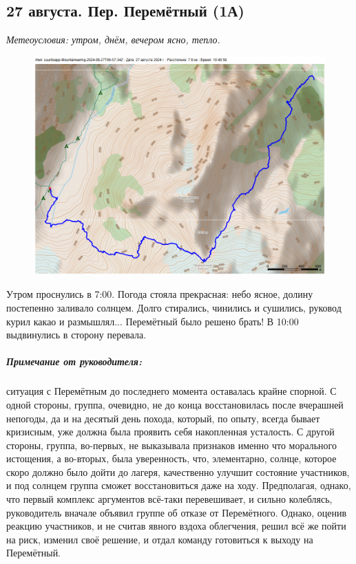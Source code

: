 \subsection{27 августа. Пер. Перемётный (1А)}
\textit{Метеоусловия: утром, днём, вечером ясно, тепло.}

\begin{figure}[h!]
	\centering
	\includegraphics[angle=0, width=0.7\linewidth]{../pics/mini_maps/27}
	\label{fig:mini_27}
\end{figure}

Утром проснулись в 7:00. Погода стояла прекрасная: небо ясное, долину постепенно заливало солнцем. Долго стирались, чинились и сушились, руковод курил какао и размышлял... Перемётный было решено брать!
В 10:00 выдвинулись в сторону перевала. 

\subparagraph{Примечание от руководителя:} ситуация с Перемётным до последнего момента оставалась крайне спорной. С одной стороны, группа, очевидно, не до конца восстановилась после вчерашней непогоды, да и на десятый день похода, который, по опыту, всегда бывает кризисным, уже должна была проявить себя накопленная усталость. С другой стороны, группа, во-первых, не выказывала признаков именно что морального истощения, а во-вторых, была уверенность, что, элементарно, солнце, которое скоро должно было дойти до лагеря, качественно улучшит состояние участников, и под солнцем группа сможет восстановиться даже на ходу. Предполагая, однако, что первый комплекс аргументов всё-таки перевешивает, и сильно колеблясь, руководитель вначале объявил группе об отказе от Перемётного. Однако, оценив реакцию участников, и не считав явного вздоха облегчения, решил всё же пойти на риск, изменил своё решение, и отдал команду готовиться к выходу на Перемётный.


